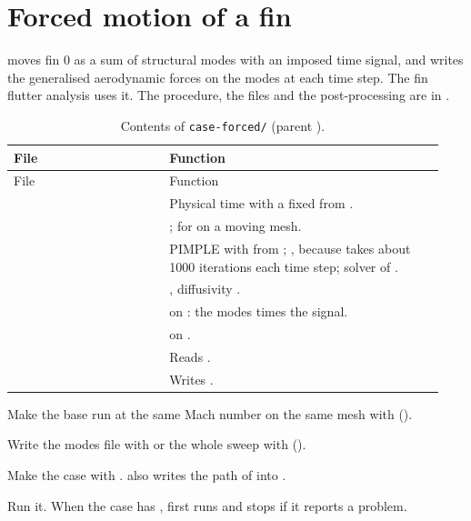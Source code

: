 \section{Forced motion of a fin}\label{sec:forced}

 moves fin 0 as a sum of structural modes with an imposed time
signal, and writes the generalised aerodynamic forces on the modes at each time step.
The fin flutter analysis uses it. The procedure, the files and the post-processing are
in .

\begin{longtable}{@{}P{0.34\linewidth} P{0.60\linewidth}@{}}
\caption{Contents of \texttt{case-forced/} (parent ).}\label{tab:forced}\\
\toprule
File & Function \\
\midrule
\endfirsthead
\toprule
File & Function \\
\midrule
\endhead
{} & Physical time with a fixed  from . \\
 & ;  for  on a moving mesh. \\
 & PIMPLE with  from ; , because  takes about 1000 iterations each time step; solver of . \\
 & , diffusivity . \\
 &  on : the modes times the signal. \\
 &  on . \\
 & Reads . \\
 & Writes . \\
\bottomrule
\end{longtable}

\begin{steps}
\item Make the base run at the same Mach number on the same mesh with
   ().
\item Write the modes file with  or the whole sweep
  with  ().
\item Make the case with .
   also writes the path of  into
  .
\item Run it. When the case has ,  first runs
   and stops if it reports a problem.
\end{steps}


